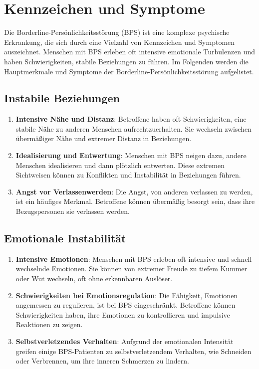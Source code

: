 \section{Kennzeichen und Symptome}

Die Borderline-Persönlichkeitsstörung (BPS) ist eine komplexe psychische Erkrankung, die sich durch eine Vielzahl von Kennzeichen und Symptomen auszeichnet. Menschen mit BPS erleben oft intensive emotionale Turbulenzen und haben Schwierigkeiten, stabile Beziehungen zu führen. Im Folgenden werden die Hauptmerkmale und Symptome der Borderline-Persönlichkeitsstörung aufgelistet.

\subsection{Instabile Beziehungen}

\begin{enumerate}
\item \textbf{Intensive Nähe und Distanz}: Betroffene haben oft Schwierigkeiten, eine stabile Nähe zu anderen Menschen aufrechtzuerhalten. Sie wechseln zwischen übermäßiger Nähe und extremer Distanz in Beziehungen.

\item \textbf{Idealisierung und Entwertung}: Menschen mit BPS neigen dazu, andere Menschen idealisieren und dann plötzlich entwerten. Diese extremen Sichtweisen können zu Konflikten und Instabilität in Beziehungen führen.

\item \textbf{Angst vor Verlassenwerden}: Die Angst, von anderen verlassen zu werden, ist ein häufiges Merkmal. Betroffene können übermäßig besorgt sein, dass ihre Bezugspersonen sie verlassen werden.
\end{enumerate}

\subsection{Emotionale Instabilität}

\begin{enumerate}
\item \textbf{Intensive Emotionen}: Menschen mit BPS erleben oft intensive und schnell wechselnde Emotionen. Sie können von extremer Freude zu tiefem Kummer oder Wut wechseln, oft ohne erkennbaren Auslöser.

\item \textbf{Schwierigkeiten bei Emotionsregulation}: Die Fähigkeit, Emotionen angemessen zu regulieren, ist bei BPS eingeschränkt. Betroffene können Schwierigkeiten haben, ihre Emotionen zu kontrollieren und impulsive Reaktionen zu zeigen.

\item \textbf{Selbstverletzendes Verhalten}: Aufgrund der emotionalen Intensität greifen einige BPS-Patienten zu selbstverletzendem Verhalten, wie Schneiden oder Verbrennen, um ihre inneren Schmerzen zu lindern.
\end{enumerate}

